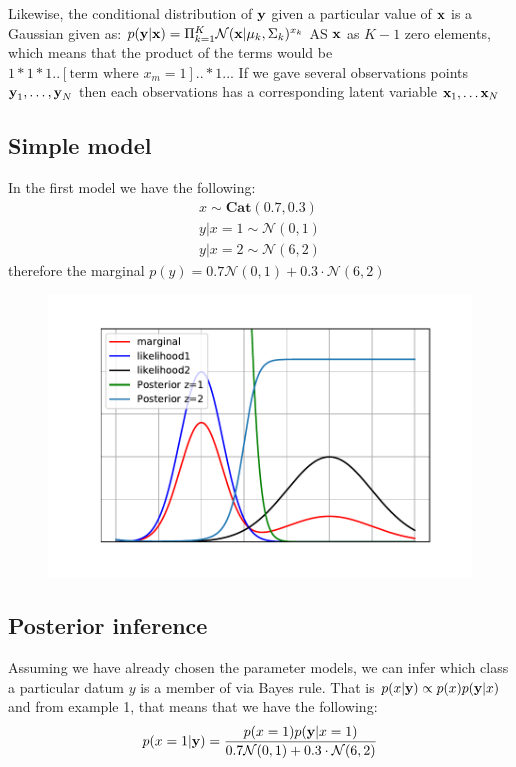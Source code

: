 Likewise, the conditional distribution of $\textbf{y}$ given a particular value of $\textbf{x}$ is a Gaussian given as:
$p(\textbf{y}|\textbf{x}) = \Pi_{k=1}^{K}\mathcal{N}(\textbf{x} | \boldmath{\mu}_{k}, \boldmath{\Sigma}_{k})^{x_{k}}$
AS $\textbf{x}$ as $K-1$ zero elements, which means that the product of the terms would be $1*1*1..[\text{term where } x_{m} = 1]..*1..$. If we gave several observations points $\textbf{y}_{1}, \dots, \textbf{y}_{N}$ then each observations has a corresponding latent variable $\textbf{x}_{1}, \ldots \textbf{x}_{N}$
\subsection{Simple model}
In the first model we have the following:
\begin{align}
x \sim \textbf{Cat}(0.7,0.3) \\
y | x = 1 \sim \mathcal{N}(0,1) \\
y | x = 2 \sim \mathcal{N}(6,2)
\end{align}
therefore the marginal $p(y) = 0.7\mathcal{N}(0,1) + 0.3\cdot \mathcal{N}(6,2)$

\begin{figure}[h!]
	\includegraphics{code/example1.pdf}
\end{figure}

\subsection{Posterior inference}
Assuming we have already chosen the parameter models, we can infer which class a particular datum $y$ is a member of  via Bayes rule. That is $p(x|\textbf{y}) \propto p(x)p(\textbf{y}|x)$ and from example 1, that means that we have the following: \begin{align}
p(x=1|\textbf{y}) =  \frac{p(x=1)p(\textbf{y}|x=1)}{0.7\mathcal{N}(0,1) + 0.3\cdot \mathcal{N}(6,2)}
\end{align}

